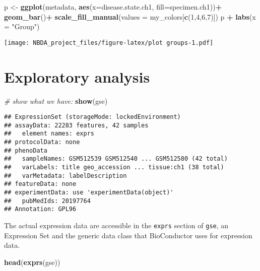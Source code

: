 \documentclass[
]{article}
\newenvironment{Shaded}{\begin{snugshade}}{\end{snugshade}}
\newcommand{\AttributeTok}[1]{\textcolor[rgb]{0.13,0.29,0.53}{#1}}
\newcommand{\CommentTok}[1]{\textcolor[rgb]{0.56,0.35,0.01}{\textit{#1}}}
\newcommand{\DecValTok}[1]{\textcolor[rgb]{0.00,0.00,0.81}{#1}}
\newcommand{\FunctionTok}[1]{\textcolor[rgb]{0.13,0.29,0.53}{\textbf{#1}}}
\newcommand{\NormalTok}[1]{#1}
\newcommand{\OtherTok}[1]{\textcolor[rgb]{0.56,0.35,0.01}{#1}}
\newcommand{\SpecialCharTok}[1]{\textcolor[rgb]{0.81,0.36,0.00}{\textbf{#1}}}
\newcommand{\StringTok}[1]{\textcolor[rgb]{0.31,0.60,0.02}{#1}}
\begin{document}
\begin{Shaded}
\begin{Highlighting}[]
\NormalTok{p }\OtherTok{\textless{}{-}} \FunctionTok{ggplot}\NormalTok{(metadata, }\FunctionTok{aes}\NormalTok{(}\AttributeTok{x=}\NormalTok{disease.state.ch1, }\AttributeTok{fill=}\NormalTok{specimen.ch1))}\SpecialCharTok{+}
  \FunctionTok{geom\_bar}\NormalTok{()}\SpecialCharTok{+}
  \FunctionTok{scale\_fill\_manual}\NormalTok{(}\AttributeTok{values =}\NormalTok{ my\_colors[}\FunctionTok{c}\NormalTok{(}\DecValTok{1}\NormalTok{,}\DecValTok{4}\NormalTok{,}\DecValTok{6}\NormalTok{,}\DecValTok{7}\NormalTok{)])}
\NormalTok{p }\SpecialCharTok{+} \FunctionTok{labs}\NormalTok{(}\AttributeTok{x =} \StringTok{"Group"}\NormalTok{) }
\end{Highlighting}
\end{Shaded}

\texttt{[image: NBDA\_project\_files/figure-latex/plot groups-1.pdf]}

\section{Exploratory analysis}\label{exploratory-analysis}

\begin{Shaded}
\begin{Highlighting}[]
\CommentTok{\# show what we have:}
\FunctionTok{show}\NormalTok{(gse)}
\end{Highlighting}
\end{Shaded}

\begin{verbatim}
## ExpressionSet (storageMode: lockedEnvironment)
## assayData: 22283 features, 42 samples 
##   element names: exprs 
## protocolData: none
## phenoData
##   sampleNames: GSM512539 GSM512540 ... GSM512580 (42 total)
##   varLabels: title geo_accession ... tissue:ch1 (38 total)
##   varMetadata: labelDescription
## featureData: none
## experimentData: use 'experimentData(object)'
##   pubMedIds: 20197764 
## Annotation: GPL96
\end{verbatim}

The actual expression data are accessible in the \texttt{exprs} section
of \texttt{gse}, an Expression Set and the generic data class that
BioConductor uses for expression data.

\begin{Shaded}
\begin{Highlighting}[]
\FunctionTok{head}\NormalTok{(}\FunctionTok{exprs}\NormalTok{(gse)) }
\end{Highlighting}
\end{Shaded}
\end{document}
